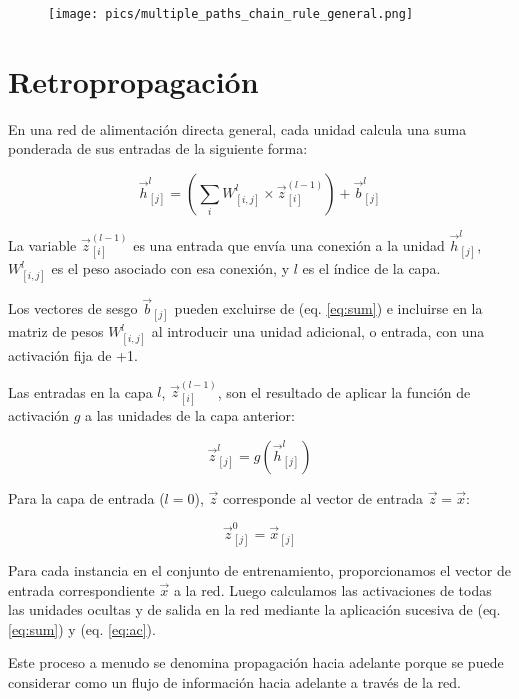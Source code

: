 \begin{figure}[htb]
	\centering
	 \texttt{[image: pics/multiple\_paths\_chain\_rule\_general.png]}
\end{figure}

\section{Retropropagación}

En una red de alimentación directa general, cada unidad calcula una suma ponderada de sus entradas de la siguiente forma:

\begin{equation}
\vec{h}_{[j]}^l = \left(\sum_{i}  W_{[i,j]}^l \times \vec{z}_{[i]}^{(l-1)}\right) + \vec{b}_{[j]}^l
\label{eq:sum}
\end{equation}

La variable $\vec{z}_{[i]}^{(l-1)}$ es una entrada que envía una conexión a la unidad $\vec{h}_{[j]}^l$, $W_{[i,j]}^l$ es el peso asociado con esa conexión, y $l$ es el índice de la capa.

Los vectores de sesgo $\vec{b}_{[j]}$ pueden excluirse de (eq. \ref{eq:sum}) e incluirse en la matriz de pesos $W_{[i,j]}^l$ al introducir una unidad adicional, o entrada, con una activación fija de +1.

Las entradas en la capa $l$, $\vec{z}_{[i]}^{(l-1)}$, son el resultado de aplicar la función de activación $g$ a las unidades de la capa anterior:

\begin{equation}
\vec{z}_{[j]}^{l} = g(\vec{h}_{[j]}^{l})
\label{eq:ac}
\end{equation}

Para la capa de entrada ($l=0$), $\vec{z}$ corresponde al vector de entrada $\vec{z} = \vec{x}$:

\begin{equation}
\vec{z}_{[j]}^0 = \vec{x}_{[j]}
\end{equation}

Para cada instancia en el conjunto de entrenamiento, proporcionamos el vector de entrada correspondiente $\vec{x}$ a la red. Luego calculamos las activaciones de todas las unidades ocultas y de salida en la red mediante la aplicación sucesiva de (eq. \ref{eq:sum}) y (eq. \ref{eq:ac}).

Este proceso a menudo se denomina propagación hacia adelante porque se puede considerar como un flujo de información hacia adelante a través de la red.

